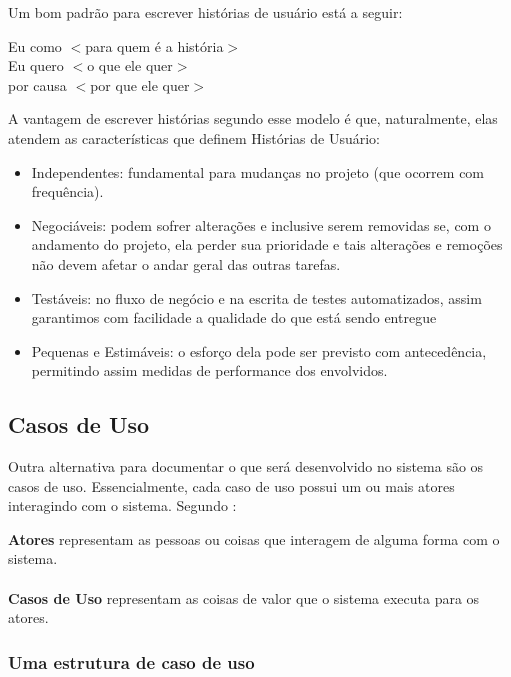 Um bom padrão para escrever histórias de usuário está a seguir\cite{jonathanrasmusson}:

\begin{citacaoLonga}
Eu como $<$para quem é a história$>$
\\
Eu quero $<$o que ele quer$>$
\\
por causa $<$por que ele quer$>$
\end{citacaoLonga}

A vantagem de escrever histórias segundo esse modelo é que, naturalmente, elas atendem as características que definem Histórias de Usuário:

\begin{itemize}
    \item Independentes: fundamental para mudanças no projeto (que ocorrem com frequência).
    \item Negociáveis: podem sofrer alterações e inclusive serem removidas se, com o andamento do projeto, ela perder sua prioridade e tais alterações e remoções não devem afetar o andar geral das outras tarefas.
    \item Testáveis: no fluxo de negócio e na escrita de testes automatizados, assim garantimos com facilidade a qualidade do que está sendo entregue
    \item Pequenas e Estimáveis: o esforço dela pode ser previsto com antecedência, permitindo assim medidas de performance dos envolvidos.
\end{itemize}

\subsection{Casos de Uso}
Outra alternativa para documentar o que será desenvolvido no sistema são os casos de uso. Essencialmente, cada caso de uso possui um ou mais atores interagindo com o sistema. Segundo \cite{kurtbittnerianspence2002}:

\begin{citacaoLonga}
\textbf{Atores} representam as pessoas ou coisas que interagem de alguma forma com o sistema.
\\
\\
\textbf{Casos de Uso} representam as coisas de valor que o sistema executa para os atores.
\end{citacaoLonga}

\subsubsection{Uma estrutura de caso de uso\cite{ibm2011}}


